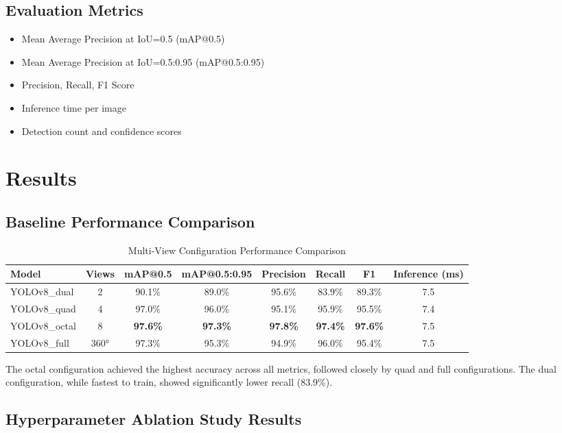 \documentclass[conference]{IEEEtran}
\begin{document}
\subsection{Evaluation Metrics}
\begin{itemize}
    \item Mean Average Precision at IoU=0.5 (mAP@0.5)
    \item Mean Average Precision at IoU=0.5:0.95 (mAP@0.5:0.95)
    \item Precision, Recall, F1 Score
    \item Inference time per image
    \item Detection count and confidence scores
\end{itemize}

\section{Results}

\subsection{Baseline Performance Comparison}

\begin{table*}[t]
\centering
\caption{Multi-View Configuration Performance Comparison}
\begin{tabular}{lccccccc}
\toprule
\textbf{Model} & \textbf{Views} & \textbf{mAP@0.5} & \textbf{mAP@0.5:0.95} & \textbf{Precision} & \textbf{Recall} & \textbf{F1} & \textbf{Inference (ms)} \\
\midrule
YOLOv8\_dual & 2 & 90.1\% & 89.0\% & 95.6\% & 83.9\% & 89.3\% & 7.5 \\
YOLOv8\_quad & 4 & 97.0\% & 96.0\% & 95.1\% & 95.9\% & 95.5\% & 7.4 \\
YOLOv8\_octal & 8 & \textbf{97.6\%} & \textbf{97.3\%} & \textbf{97.8\%} & \textbf{97.4\%} & \textbf{97.6\%} & 7.5 \\
YOLOv8\_full & 360° & 97.3\% & 95.3\% & 94.9\% & 96.0\% & 95.4\% & 7.5 \\
\bottomrule
\end{tabular}
\end{table*}

The octal configuration achieved the highest accuracy across all metrics, followed closely by quad and full configurations. The dual configuration, while fastest to train, showed significantly lower recall (83.9\%).

\subsection{Hyperparameter Ablation Study Results}
\end{document}
